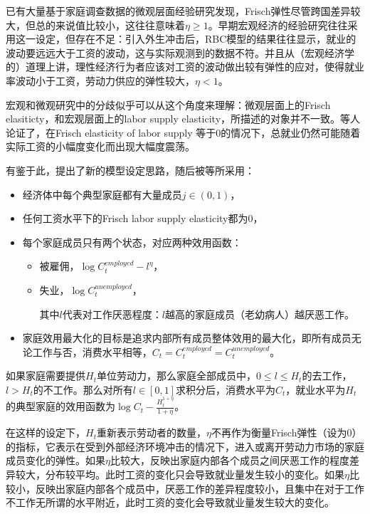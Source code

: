 已有大量基于家庭调查数据的微观层面经验研究发现，Frisch弹性尽管跨国差异较大，但总的来说值比较小，这往往意味着$\eta \ge 1$。早期宏观经济的经验研究往往采用这一设定，但存在不足：引入外生冲击后，RBC模型的结果往往显示，就业的波动要远远大于工资的波动，这与实际观测到的数据不符。并且从（宏观经济学的）道理上讲，理性经济行为者应该对工资的波动做出较有弹性的应对，使得就业率波动小于工资，劳动力供应的弹性较大，$\eta <1$。

宏观和微观研究中的分歧似乎可以从这个角度来理解：微观层面上的Frisch elasiticty，和宏观层面上的labor supply elasticity，所描述的对象并不一致。\cite{Rogerson:1988js,Hansen:1985ku}等人论证了，在Frisch elasticity of labor supply 等于0的情况下，总就业仍然可能随着实际工资的小幅度变化而出现大幅度震荡\citep{Rogerson:2009eza}。

有鉴于此，\cite{Gali:2005gp}提出了新的模型设定思路，随后被\cite{Christiano:2010wla,Mulligan:2001wf,Krusell:2008bw,Krusell:2011bv}等所采用：
\begin{itemize}
\item 经济体中每个典型家庭都有大量成员$j \in (0,1)$，
\item 任何工资水平下的Frisch labor supply elasticity都为$0$，
\item 每个家庭成员只有两个状态，对应两种效用函数：
  \begin{itemize}
  \item 被雇佣，$\log C^{employed}_t - l^{\eta}$，
  \item 失业，$\log C^{unemployed}_t$，

其中$l$代表对工作厌恶程度：$l$越高的家庭成员（老幼病人）越厌恶工作。
  \end{itemize}
\item 家庭效用最大化的目标是追求内部所有成员整体效用的最大化，即所有成员无论工作与否，消费水平相等，$C_t = C^{employed}_t = C^{unemployed}_t$。
\end{itemize}

如果家庭需要提供$H_t$单位劳动力，那么家庭全部成员中，$0\le l \le H_t$的去工作，$l > H_t$的不工作。那么对所有$l \in [0,1]$求积分后，消费水平为$C_t$，就业水平为$H_t$的典型家庭的效用函数为$\log C_t - \frac{H_t^{1+\eta}}{1+\eta}$。

在这样的设定下，$H_t$重新表示劳动者的数量，$\eta$不再作为衡量Frisch弹性（设为0）的指标，它表示在受到外部经济环境冲击的情况下，进入或离开劳动力市场的家庭成员变化的弹性。如果$\eta$比较大，反映出家庭内部各个成员之间厌恶工作的程度差异较大，分布较平均。此时工资的变化只会导致就业量发生较小的变化。如果$\eta$比较小，反映出家庭内部各个成员中，厌恶工作的差异程度较小，且集中在对于工作不工作无所谓的水平附近，此时工资的变化会导致就业量发生较大的变化。

